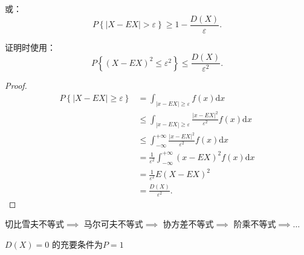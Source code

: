 或：
\[
    P\left\{ \left| X-EX \right| >\varepsilon \right\} \ge 1-\frac{D\left( X \right) }{\varepsilon}
.\] 

证明时使用： \[
    P\left\{ \left( X-EX \right) ^2\le \varepsilon^2 \right\} \le \frac{D\left( X \right) }{\varepsilon^2}
.\] 
\begin{proof}
    \begin{align*}
        P\left\{ \left| X-EX \right| \ge \varepsilon \right\} &= \int_{\left| x-EX \right| \ge \varepsilon} f\left( x \right)  \mathrm{d}x \\
        &\le  \int_{\left| x-EX \right| \ge \varepsilon}^{} \frac{\left| x-EX \right| ^2}{\varepsilon^2}f\left( x \right)  \mathrm{d}x \\
        &\le \int_{-\infty}^{+\infty} \frac{\left| x-EX \right| ^2}{\varepsilon^2}f\left( x \right)  \mathrm{d}x \\
        &= \frac{1}{\varepsilon^2}\int_{-\infty}^{+\infty} \left( x-EX \right) ^2f\left( x \right)  \mathrm{d}x \\
        &= \frac{1}{\varepsilon^2}E\left( X-EX \right) ^2 \\
        &= \frac{D\left( X \right) }{\varepsilon^2} 
    .\end{align*}
\end{proof}
\begin{notation}
    切比雪夫不等式$\implies$ 马尔可夫不等式$\implies$ 协方差不等式$\implies$ 阶乘不等式$\implies\ldots$

    $D\left( X \right) =0$ 的充要条件为$P=1$
\end{notation}




